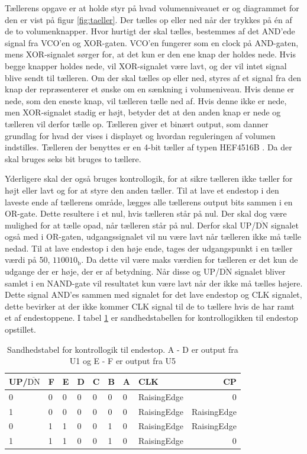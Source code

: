 Tællerens opgave er at holde styr på hvad volumenniveauet er og diagrammet for den er vist på figur \ref{fig:taeller}. Der tælles op eller ned når der trykkes på én af de to volumenknapper. Hvor hurtigt der skal tælles, bestemmes af det AND'ede signal fra VCO'en og XOR-gaten. VCO'en fungerer som en clock på AND-gaten, mens XOR-signalet sørger for, at det kun er den ene knap der holdes nede. Hvis begge knapper holdes nede, vil XOR-signalet være lavt, og der vil intet signal blive sendt til tælleren. Om der skal tælles op eller ned, styres af et signal fra den knap der repræsenterer et ønske om en sænkning i volumeniveau. Hvis denne er nede, som den eneste knap, vil tælleren tælle ned af. Hvis denne ikke er nede, men XOR-signalet stadig er højt, betyder det at den anden knap er nede og tælleren vil derfor tælle op. Tælleren giver et binært output, som danner grundlag for hvad der vises i displayet og hvordan reguleringen af volumen indstilles. Tælleren der benyttes er en 4-bit tæller af typen HEF4516B \cite{hef4516b-datablad}. Da der skal bruges seks bit bruges to tællere.

Yderligere skal der også bruges kontrollogik, for at sikre tælleren ikke tæller for højt eller lavt og for at styre den anden tæller. Til at lave et endestop i den laveste ende af tællerens område, lægges alle tællerens output bits sammen i en OR-gate. Dette resultere i et nul, hvis tælleren står på nul. Der skal dog være mulighed for at tælle opad, når tælleren står på nul. Derfor skal UP/$\overline{\mathrm{DN}}$ signalet også med i OR-gaten, udgangssignalet vil nu være lavt når tælleren ikke må tælle nedad. Til at lave endestop i den høje ende, tages der udgangspunkt i en tæller værdi på 50, $110010_\mathrm{b}$. Da dette vil være maks værdien for tælleren er det kun de udgange der er høje, der er af betydning. Når disse og UP/$\overline{\mathrm{DN}}$ signalet bliver samlet i en NAND-gate vil resultatet kun være lavt når der ikke må tælles højere. Dette signal AND'es sammen med signalet for det lave endestop og CLK signalet, dette bevirker at der ikke kommer CLK signal til de to tællere hvis de har ramt et af endestoppene. I tabel \ref{tab:taeller} er sandhedstabellen for kontrollogikken til endestop opstillet.

\begin{table}[h]
\centering
\begin{tabular}{|l|l|l|l|l|l|l|l||r|}
\hline
UP/$\overline{\mathrm{DN}}$ & F & E & D & C & B & A & CLK & CP \\ \hline
0 & 0 & 0 & 0 & 0 & 0 & 0 & RaisingEdge & 0 \\
1 & 0 & 0 & 0 & 0 & 0 & 0 & RaisingEdge & RaisingEdge \\
0 & 1 & 1 & 0 & 0 & 1 & 0 & RaisingEdge & RaisingEdge \\
1 & 1 & 1 & 0 & 0 & 1 & 0 & RaisingEdge & 0 \\
\hline
\end{tabular}
\caption{Sandhedstabel for kontrollogik til endestop. A - D er output fra U1 og E - F er output fra U5}
\label{tab:taeller}
\end{table}

